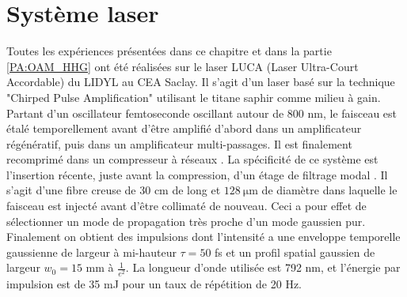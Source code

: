\section{Système laser}
\label{sec:laser}
Toutes les expériences présentées dans ce chapitre et dans la partie \ref{PA:OAM_HHG} ont été réalisées sur le laser LUCA (Laser Ultra-Court Accordable) du LIDYL au CEA Saclay. Il s'agit d'un laser basé sur la technique "Chirped Pulse Amplification" utilisant le titane saphir comme milieu à gain. Partant d'un oscillateur femtoseconde oscillant autour de 800 nm, le faisceau est étalé temporellement avant d'être amplifié d'abord dans un amplificateur régénératif, puis dans un amplificateur multi-passages. Il est finalement recomprimé dans un compresseur à réseaux . La spécificité de ce système est l'insertion récente, juste avant la compression, d'un étage de filtrage modal . Il s'agit d'une fibre creuse de 30 cm de long et $\SI{128}{\micro\metre}$ de diamètre dans laquelle le faisceau est injecté avant d'être collimaté de nouveau. Ceci a pour effet de sélectionner un mode de propagation très proche d'un mode gaussien pur. Finalement on obtient des impulsions dont l'intensité a une enveloppe temporelle gaussienne de largeur à mi-hauteur $\tau = 50$ fs et un profil spatial gaussien de largeur $w_0 = 15$ mm à $\frac{1}{e^2}$. La longueur d'onde utilisée est 792 nm, et l'énergie par impulsion est de 35 mJ pour un taux de répétition de 20 Hz. 

